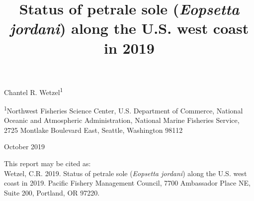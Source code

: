 \documentclass[12pt,]{article}
\title{Status of petrale sole (\emph{Eopsetta jordani}) along the U.S. west
coast in 2019}
\author{}
\date{}
\begin{document}
\maketitle


\begin{center}
\thispagestyle{empty}


\vspace{.5cm}




Chantel R. Wetzel\textsuperscript{1}\\


\vspace{.5cm}

\small
\textsuperscript{1}Northwest Fisheries Science Center, U.S. Department of Commerce, National Oceanic and Atmospheric Administration, National Marine Fisheries Service, 2725 Montlake Boulevard East, Seattle, Washington 98112\\

\vspace{.3cm}





\vspace{1cm}

\vfill
October 2019

\vspace{1cm}



\vspace{.3cm}

\newpage

\vspace{3cm}

This report may be cited as:\\

Wetzel, C.R. 2019. Status of petrale sole (\textit{Eopsetta jordani}) along the U.S. west coast in 2019. Pacific Fishery Management Council, 7700 Ambassador Place NE, Suite 200, Portland, OR 97220. 
\end{center}
\end{document}
